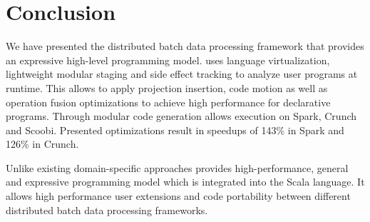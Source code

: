 \section{Conclusion}
\label{sec:conclusion}

We have presented the distributed batch data processing framework \tool that provides an
expressive high-level programming model. \tool uses language virtualization,
lightweight modular staging and side effect tracking to analyze user programs at
runtime. This allows \tool to apply projection insertion, code motion as well as
operation fusion optimizations to achieve high performance for declarative
programs. Through modular code generation \tool allows execution on Spark,
Crunch and Scoobi. Presented optimizations result in speedups of 143\% in Spark and 
126\% in Crunch.

Unlike existing domain-specific approaches \tool provides high-performance,
general and expressive programming model which is integrated into the Scala language.
It allows high performance user extensions and code portability between different distributed batch data processing frameworks.

